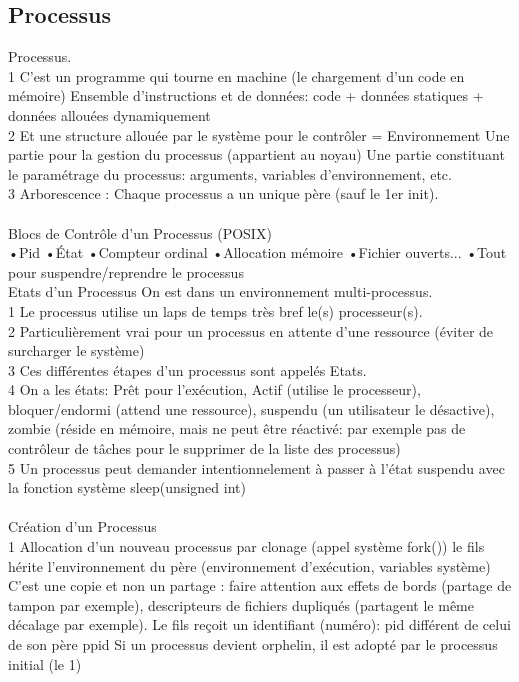\documentclass[5pt]{article}
\begin{document}
\begin{scriptsize}
\subsection{Processus}
Processus.\\
1 C’est un programme qui tourne en machine (le chargement d’un code en mémoire) Ensemble d’instructions et de données: code + données statiques + données allouées dynamiquement\\
2 Et une structure allouée par le système pour le contrôler = Environnement Une partie pour la gestion du processus (appartient au noyau) Une partie constituant le paramétrage du processus: arguments, variables d’environnement, etc.\\
3 Arborescence : Chaque processus a un unique père (sauf le 1er init).\\
\\
Blocs de Contrôle d’un Processus (POSIX)\\
•Pid •État •Compteur ordinal •Allocation mémoire •Fichier ouverts... •Tout pour suspendre/reprendre le processus\\
Etats d’un Processus
On est dans un environnement multi-processus.\\
1 Le processus utilise un laps de temps très bref le(s) processeur(s).\\
2 Particulièrement vrai pour un processus en attente d’une ressource (éviter de surcharger le système)\\
3 Ces différentes étapes d’un processus sont appelés Etats.\\
4 On a les états: Prêt pour l’exécution, Actif (utilise le processeur), bloquer/endormi (attend une ressource), suspendu (un utilisateur le désactive), zombie (réside en mémoire, mais ne peut être réactivé: par exemple pas de contrôleur de tâches pour le supprimer de la liste des processus)\\
5 Un processus peut demander intentionnelement à passer à l’état suspendu avec la fonction système sleep(unsigned int)\\
\\
Création d’un Processus\\
1 Allocation d’un nouveau processus par clonage (appel système fork()) le fils hérite l’environnement du père (environnement d’exécution, variables système) C’est une copie et non un partage : faire attention aux effets de bords (partage de tampon par exemple), descripteurs de fichiers dupliqués (partagent le même décalage par exemple). Le fils reçoit un identifiant (numéro): pid différent de celui de son père ppid Si un processus devient orphelin, il est adopté par le processus initial (le 1)\\

\end{scriptsize}
\end{document}
